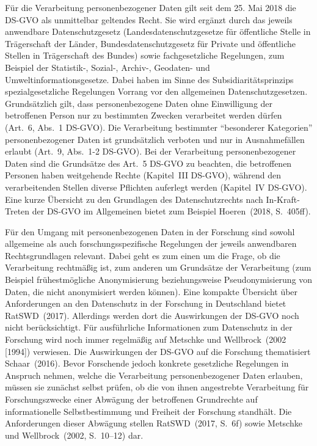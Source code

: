 \documentclass[a4paper,
fontsize=11pt,
oneside,
numbers=noperiodatend,
parskip=half-,
bibliography=totoc,
final
]{scrartcl}
\begin{document}
Für die Verarbeitung personenbezogener Daten gilt seit dem 25. Mai 2018
die DS-GVO als unmittelbar geltendes Recht. Sie wird ergänzt durch das
jeweils anwendbare Datenschutzgesetz (Landesdatenschutzgesetze für
öffentliche Stelle in Trägerschaft der Länder, Bundesdatenschutzgesetz
für Private und öffentliche Stellen in Trägerschaft des Bundes) sowie
fachgesetzliche Regelungen, zum Beispiel der Statistik-, Sozial-,
Archiv-, Geodaten- und Umweltinformationsgesetze. Dabei haben im Sinne
des Subsidiaritätsprinzips spezialgesetzliche Regelungen Vorrang vor den
allgemeinen Datenschutzgesetzen. Grundsätzlich gilt, dass
personenbezogene Daten ohne Einwilligung der betroffenen Person nur zu
bestimmten Zwecken verarbeitet werden dürfen (Art.~6, Abs.~1 DS-GVO).
Die Verarbeitung bestimmter \enquote{besonderer Kategorien}
personenbezogener Daten ist grundsätzlich verboten und nur in
Ausnahmefällen erlaubt (Art.~9, Abs.~1-2 DS-GVO). Bei der Verarbeitung
personenbezogener Daten sind die Grundsätze des Art.~5 DS-GVO zu
beachten, die betroffenen Personen haben weitgehende Rechte (Kapitel~III
DS-GVO), während den verarbeitenden Stellen diverse Pflichten auferlegt
werden (Kapitel~IV DS-GVO). Eine kurze Übersicht zu den Grundlagen des
Datenschutzrechts nach In-Kraft-Treten der DS-GVO im Allgemeinen bietet
zum Beispiel Hoeren~(2018, S.~405ff).

Für den Umgang mit personenbezogenen Daten in der Forschung sind sowohl
allgemeine als auch forschungsspezifische Regelungen der jeweils
anwendbaren Rechtsgrundlagen relevant. Dabei geht es zum einen um die
Frage, ob die Verarbeitung rechtmäßig ist, zum anderen um Grundsätze der
Verarbeitung (zum Beispiel frühestmögliche Anonymisierung
beziehungsweise Pseudonymisierung von Daten, die nicht anonymisiert
werden können). Eine kompakte Übersicht über Anforderungen an den
Datenschutz in der Forschung in Deutschland bietet RatSWD~(2017).
Allerdings werden dort die Auswirkungen der DS-GVO noch nicht
berücksichtigt. Für ausführliche Informationen zum Datenschutz in der
Forschung wird noch immer regelmäßig auf Metschke und Wellbrock~(2002
{[}1994{]}) verwiesen. Die Auswirkungen der DS-GVO auf die Forschung
thematisiert Schaar~(2016). Bevor Forschende jedoch konkrete gesetzliche
Regelungen in Anspruch nehmen, welche die Verarbeitung personenbezogener
Daten erlauben, müssen sie zunächst selbst prüfen, ob die von ihnen
angestrebte Verarbeitung für Forschungszwecke einer Abwägung der
betroffenen Grundrechte auf informationelle Selbstbestimmung und
Freiheit der Forschung standhält. Die Anforderungen dieser Abwägung
stellen RatSWD~(2017, S.~6f) sowie Metschke und Wellbrock~(2002,
S.~10--12) dar.
\end{document}
